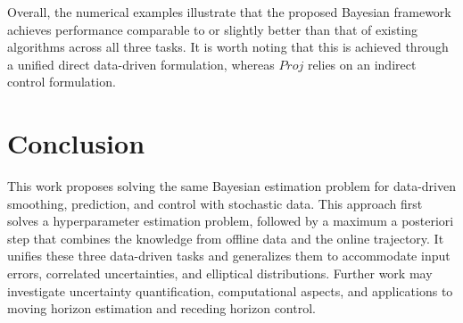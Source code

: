 \documentclass{ifacconf}
\begin{document}
Overall, the numerical examples illustrate that the proposed Bayesian framework achieves performance comparable to or slightly better than that of existing algorithms across all three tasks. It is worth noting that this is achieved through a unified direct data-driven formulation, whereas $\textit{Proj}$ relies on an indirect control formulation.

\section{Conclusion}

This work proposes solving the same Bayesian estimation problem for data-driven smoothing, prediction, and control with stochastic data. This approach first solves a hyperparameter estimation problem, followed by a maximum a posteriori step that combines the knowledge from offline data and the online trajectory. It unifies these three data-driven tasks and generalizes them to accommodate input errors, correlated uncertainties, and elliptical distributions. Further work may investigate uncertainty quantification, computational aspects, and applications to moving horizon estimation and receding horizon control.



\appendix
\end{document}
